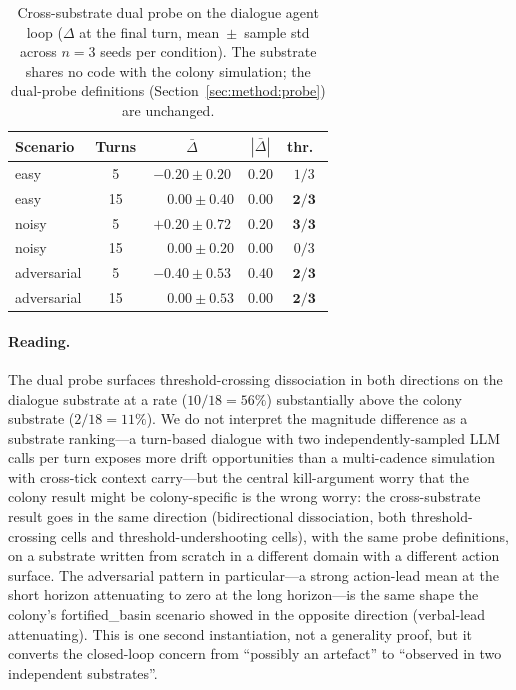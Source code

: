 \begin{table}[t]
  \centering
  \scriptsize
  \setlength{\tabcolsep}{3pt}
  \begin{tabular}{l c c c c}
    \toprule
    Scenario & Turns & $\bar\Delta$ & $|\bar\Delta|$ & thr.\ \\
    \midrule
    \textsf{easy}        & 5  & $-0.20{\pm}0.20$ & $0.20$ & $1/3$ \\
    \textsf{easy}        & 15 & $\phantom{-}0.00{\pm}0.40$ & $0.00$ & $\mathbf{2/3}$ \\
    \textsf{noisy}       & 5  & $+0.20{\pm}0.72$ & $0.20$ & $\mathbf{3/3}$ \\
    \textsf{noisy}       & 15 & $\phantom{-}0.00{\pm}0.20$ & $0.00$ & $0/3$ \\
    \textsf{adversarial} & 5  & $-0.40{\pm}0.53$ & $0.40$ & $\mathbf{2/3}$ \\
    \textsf{adversarial} & 15 & $\phantom{-}0.00{\pm}0.53$ & $0.00$ & $\mathbf{2/3}$ \\
    \bottomrule
  \end{tabular}
  \caption{Cross-substrate dual probe on the dialogue agent loop
  ($\Delta$ at the final turn, mean~$\pm$~sample std across $n = 3$
  seeds per condition). The substrate shares no code with the
  colony simulation; the dual-probe definitions
  (Section~\ref{sec:method:probe}) are unchanged.}
  \label{tab:e1-h3}
\end{table}

\paragraph{Reading.}
The dual probe surfaces threshold-crossing dissociation in both
directions on the dialogue substrate at a rate ($10/18 = 56\%$)
substantially above the colony substrate ($2/18 = 11\%$). We do
not interpret the magnitude difference as a substrate ranking---a
turn-based dialogue with two independently-sampled LLM calls per
turn exposes more drift opportunities than a multi-cadence
simulation with cross-tick context carry---but the central
kill-argument worry that the colony result might be
colony-specific is the wrong worry: the cross-substrate result
goes in the same direction (bidirectional dissociation, both
threshold-crossing cells and threshold-undershooting cells),
with the same probe definitions, on a substrate written from
scratch in a different domain with a different action surface.
The \textsf{adversarial} pattern in particular---a strong
action-lead mean at the short horizon attenuating to zero at the
long horizon---is the same shape the colony's
\textsf{fortified\_basin} scenario showed in the opposite
direction (verbal-lead attenuating). This is one second
instantiation, not a generality proof, but it converts the
closed-loop concern from ``possibly an artefact'' to ``observed
in two independent substrates''.
